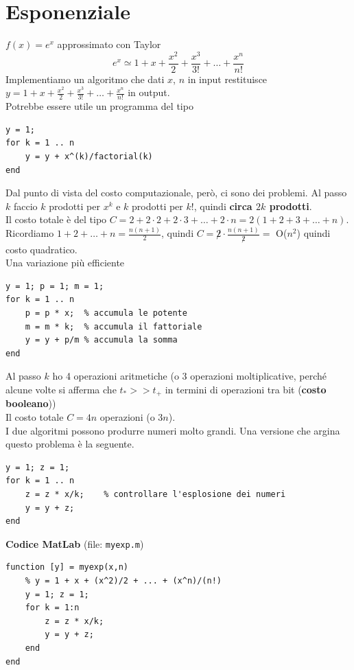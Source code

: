 \documentclass[10pt]{book}
\begin{document}
\section{Esponenziale}
$f(x) = e^x$ approssimato con Taylor $$e^x \simeq 1 + x + \frac{x^2}{2} + \frac{x^3}{3!} + \ldots + \frac{x^n}{n!}$$ Implementiamo un algoritmo che dati $x$, $n$ in input restituisce $y = 1 + x + \frac{x^2}{2} + \frac{x^3}{3!} + \ldots + \frac{x^n}{n!}$ in output.\\
Potrebbe essere utile un programma del tipo
\begin{lstlisting}
y = 1;
for k = 1 .. n
	y = y + x^(k)/factorial(k)
end
\end{lstlisting}
Dal punto di vista del costo computazionale, però, ci sono dei problemi. Al passo $k$ faccio $k$ prodotti per $x^k$ e $k$ prodotti per $k!$, quindi \textbf{circa $2k$ prodotti}.\\
Il costo totale è del tipo $C = 2 + 2\cdot 2 + 2\cdot 3 + \ldots + 2\cdot n = 2(1 + 2 + 3 + \ldots + n)$.\\
Ricordiamo $1 + 2 + \ldots + n = \frac{n(n + 1)}{2}$, quindi $C = \not 2\cdot\frac{n(n+1)}{\not 2} =$ O($n^2$) quindi costo quadratico.\\
Una variazione più efficiente
\begin{lstlisting}
y = 1; p = 1; m = 1;
for k = 1 .. n
	p = p * x;	% accumula le potente
	m = m * k;	% accumula il fattoriale
	y = y + p/m	% accumula la somma
end
\end{lstlisting}
Al passo $k$ ho 4 operazioni aritmetiche (o 3 operazioni moltiplicative, perché alcune volte si afferma che $t_* >> t_+$ in termini di operazioni tra bit (\textbf{costo booleano}))\\
Il costo totale $C = 4n$ operazioni (o $3n$).\\
I due algoritmi possono produrre numeri molto grandi. Una versione che argina questo problema è la seguente.
\begin{lstlisting}
y = 1; z = 1;
for k = 1 .. n
	z = z * x/k;	% controllare l'esplosione dei numeri
	y = y + z;
end
\end{lstlisting}
\begin{center}
\pagebreak
\textbf{Codice MatLab} (file: \texttt{myexp.m})
\begin{lstlisting}
function [y] = myexp(x,n)
    % y = 1 + x + (x^2)/2 + ... + (x^n)/(n!)
    y = 1; z = 1;
    for k = 1:n
        z = z * x/k;
        y = y + z;
    end
end
\end{lstlisting}
\end{center}
\end{document}
